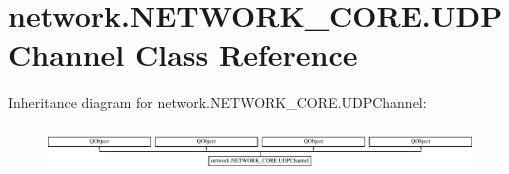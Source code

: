 \hypertarget{classnetwork_1_1NETWORK__CORE_1_1UDPChannel}{}\section{network.\+N\+E\+T\+W\+O\+R\+K\+\_\+\+C\+O\+R\+E.\+U\+D\+P\+Channel Class Reference}
\label{classnetwork_1_1NETWORK__CORE_1_1UDPChannel}
Inheritance diagram for network.\+N\+E\+T\+W\+O\+R\+K\+\_\+\+C\+O\+R\+E.\+U\+D\+P\+Channel\+:\begin{figure}[H]
\begin{center}
\leavevmode
\includegraphics[height=1.133603cm]{classnetwork_1_1NETWORK__CORE_1_1UDPChannel}
\end{center}
\end{figure}
